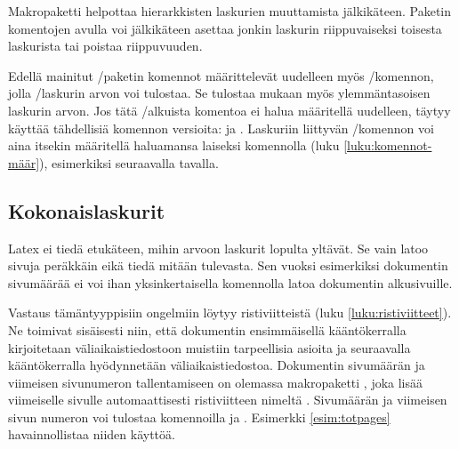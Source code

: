 Makropaketti  helpottaa
hierarkkisten laskurien muuttamista jälkikäteen. Paketin komentojen
avulla voi jälkikäteen asettaa jonkin laskurin riippuvaiseksi toisesta
laskurista tai poistaa riippuvuuden.

\begin{koodilohkosis}
\end{koodilohkosis}

Edellä mainitut \-/paketin komennot määrittelevät
uudelleen myös \-/komennon, jolla
\-/laskurin arvon voi tulostaa. Se tulostaa mukaan myös
ylemmäntasoisen laskurin arvon. Jos tätä \-/alkuista
komentoa ei halua määritellä uudelleen, täytyy käyttää tähdellisiä
komennon versioita:  ja . Laskuriin liittyvän \-/komennon
voi aina itsekin määritellä haluamansa laiseksi komennolla  (luku \ref{luku:komennot-määr}), esimerkiksi seuraavalla
tavalla.

\begin{koodilohkosis}
  \renewcommand{\theoma}{\arabic{page}/\alph{oma}}
\end{koodilohkosis}

\subsection{Kokonaislaskurit}

Latex ei tiedä etukäteen, mihin arvoon laskurit lopulta yltävät. Se vain
latoo sivuja peräkkäin eikä tiedä mitään tulevasta. Sen vuoksi
esimerkiksi dokumentin sivumäärää ei voi ihan yksinkertaisella
komennolla latoa dokumentin alkusivuille.

Vastaus tämäntyyppisiin ongelmiin löytyy ristiviitteistä (luku
\ref{luku:ristiviitteet}). Ne toimivat sisäisesti niin, että dokumentin
ensimmäisellä kääntökerralla kirjoitetaan väliaikaistiedostoon muistiin
tarpeellisia asioita ja seuraavalla kääntökerralla hyödynnetään
väliaikaistiedostoa. Dokumentin sivumäärän ja viimeisen sivunumeron
tallentamiseen on olemassa makropaketti
, joka lisää viimeiselle sivulle
automaattisesti ristiviitteen nimeltä . Sivumäärän ja
viimeisen sivun numeron voi tulostaa komennoilla  ja
. Esimerkki \ref{esim:totpages} havainnollistaa
niiden käyttöä.


